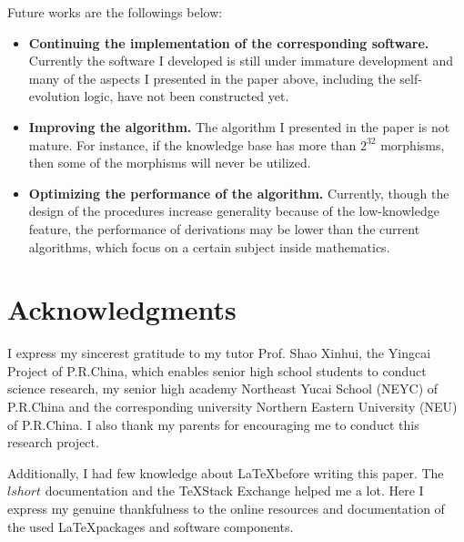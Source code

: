 \documentclass{article}
\numberwithin{theorem}{section}	%
\numberwithin{axiom}{section}	%
\numberwithin{definition}{section}	%
\begin{document}
Future works are the followings below:
\begin{itemize}
	\item \textbf{Continuing the implementation of the corresponding software.} Currently the software I developed is still under immature development and many of the aspects I presented in the paper above, including the self-evolution logic, have not been constructed yet.
	\item  \textbf{Improving the algorithm.} The algorithm I presented in the paper is not mature. For instance, if the knowledge base has more than \(2^{32}\) morphisms, then some of the morphisms will never be utilized.
	\item \textbf{Optimizing the performance of the algorithm.} Currently, though the design of the procedures increase generality because of the low-knowledge feature, the performance of derivations may be lower than the current algorithms, which focus on a certain subject inside mathematics.
\end{itemize}

\section{Acknowledgments}
I express my sincerest gratitude to my tutor Prof. Shao Xinhui, the Yingcai Project of P.R.China, which enables senior high school students to conduct science research, my senior high academy Northeast Yucai School (NEYC) of P.R.China and the corresponding university Northern Eastern University (NEU) of P.R.China. I also thank my parents for encouraging me to conduct this research project.

Additionally, I had few knowledge about \LaTeX before writing this paper. The $lshort$ documentation and the \TeX Stack Exchange helped me a lot. Here I express my genuine thankfulness to the online resources and documentation of the used \LaTeX packages and software components.



\end{document}
